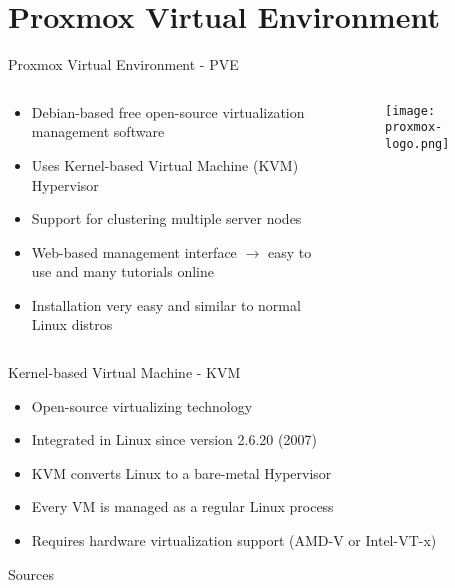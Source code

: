 \section{Proxmox Virtual Environment}

\begin{frame}[allowframebreaks]{Proxmox Virtual Environment - PVE}
    \begin{columns}
        \begin{column}{0.6\linewidth}
            \begin{itemize}
                \item Debian-based free open-source virtualization management software
                \item Uses Kernel-based Virtual Machine (KVM) Hypervisor
                \item Support for clustering multiple server nodes
                \item Web-based management interface $\rightarrow$ easy to use and many tutorials online
                \item Installation very easy and similar to normal Linux distros
            \end{itemize}
        \end{column}
        \begin{column}{0.4\linewidth}
            \begin{figure}
                \centering
                \texttt{[image: proxmox-logo.png]}\\
                \cite{proxmox-logo}
            \end{figure}
        \end{column}
    \end{columns}
\end{frame}


\begin{frame}{Kernel-based Virtual Machine - KVM}
    \begin{itemize}
        \item Open-source virtualizing technology
        \item Integrated in Linux since version 2.6.20 (2007)
        \item KVM converts Linux to a bare-metal Hypervisor
        \item Every VM is managed as a regular Linux process
        \item Requires hardware virtualization support (AMD-V or Intel-VT-x)
    \end{itemize}
\end{frame}

\begin{frame}{Sources}
    \printbibliography[title = {Sources}, heading = none]
\end{frame}